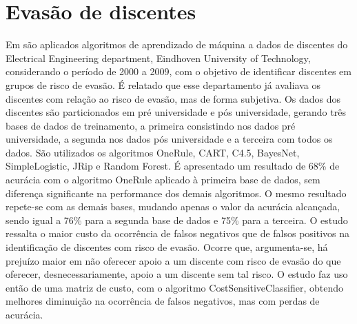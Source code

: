 \chapter{Evasão de discentes}



Em \cite{Predicting_Students} são aplicados algoritmos de aprendizado de máquina a dados de discentes do Electrical Engineering department, Eindhoven University of Technology, considerando o período de 2000 a 2009, com o objetivo de identificar discentes em grupos de risco de evasão. É relatado que esse departamento já avaliava os discentes com relação ao risco de evasão, mas de forma subjetiva. Os dados dos discentes são particionados em pré universidade e pós universidade, gerando três bases de dados de treinamento, a primeira consistindo nos dados pré universidade, a segunda nos dados pós universidade e a terceira com todos os dados. São utilizados os algoritmos OneRule, CART, C4.5, BayesNet, SimpleLogistic, JRip e Random Forest. É apresentado um resultado de 68\% de acurácia com o algoritmo OneRule aplicado à primeira base de dados, sem diferença significante na performance dos demais algoritmos. O mesmo resultado repete-se com as demais bases, mudando apenas o valor da acurácia alcançada, sendo igual a 76\% para a segunda base de dados e 75\% para a terceira. O estudo ressalta o maior custo da ocorrência de falsos negativos que de falsos positivos na identificação de discentes com risco de evasão. Ocorre que, argumenta-se, há prejuízo maior em não oferecer apoio a um discente com risco de evasão do que oferecer, desnecessariamente, apoio a um discente sem tal risco. O estudo faz uso então de uma matriz de custo, com o algoritmo CostSensitiveClassifier, obtendo melhores diminuição na ocorrência de falsos negativos, mas com perdas de acurácia. 


